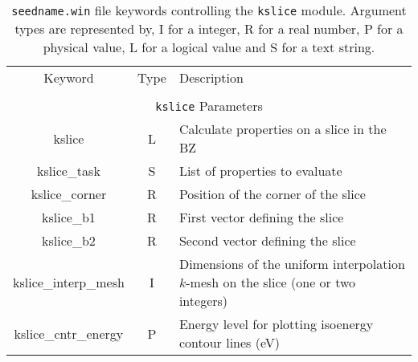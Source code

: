 \begin{table}[hH!]
\begin{center}
\begin{tabular}{|c|c|p{6cm}|}
  \hline
  Keyword & Type & Description \\
  &      &             \\
  \hline\hline
  \multicolumn{3}{|c|}{{\tt kslice} Parameters} \\
  \hline
  {\sc kslice}  & L & Calculate properties on a slice in the BZ \\
  {\sc kslice\_task}& S & List of properties to evaluate\\
  {\sc kslice\_corner}& R & Position of the corner of the slice\\
  {\sc kslice\_b1}& R & First vector defining the slice\\
  {\sc kslice\_b2}& R & Second vector defining the slice\\
  {\sc kslice\_interp\_mesh}& I & Dimensions of the uniform interpolation 
$k$-mesh on the slice (one or two integers)\\
  {\sc kslice\_cntr\_energy}& P & Energy level for  plotting 
isoenergy contour lines (eV)\\
  \hline
\end{tabular}
\caption[Parameter file keywords controlling the kslice module.]
{{\tt seedname.win} file keywords controlling the {\tt kslice}
  module. Argument types are represented by, I for a integer, R for a
  real number, P for a physical value, L for a logical value and S for
  a text string.}
\label{parameter_keywords_kslice}
\end{center}
\end{table}




